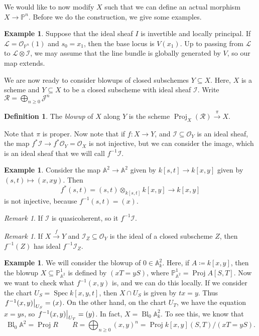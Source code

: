 \documentclass[leqno, openany]{memoir}
\theoremstyle{definition}
\newtheorem{defn}[thm]{Definition}
\newtheorem{exm}[thm]{Example}
\theoremstyle{remark}
\newtheorem{rmk}[thm]{Remark}
\theoremstyle{plain}
\theoremstyle{definition}
\theoremstyle{remark}
\newcommand{\A}{\mathbb{A}}
\renewcommand{\P}{\mathbb{P}}
\newcommand{\mc}[1]{\mathcal{#1}}
\DeclareMathOperator{\Spec}{Spec}
\DeclareMathOperator{\Proj}{Proj}
\DeclareMathOperator{\Bl}{Bl}
\begin{document}
We would like to now modify $X$ such that we can define an actual morphism $X
\to \P^n$. Before we do the construction, we give some examples.

\begin{exm} Suppose that the ideal sheaf $I$ is invertible and locally
    principal. If $\mc{L} = \mc{O}_{\P^n}(1)$ and $s_0 = x_1$, then the base
    locus is $V(x_1)$. Up to passing from $\mc{L}$ to $\mc{L} \otimes \mc{I}$,
    we may assume that the line bundle is globally generated by $V$, so our map
    extends.  \end{exm}

We are now ready to consider blowups of closed subschemes $Y \subseteq X$.
Here, $X$ is a scheme and $Y \subseteq X$ to be a closed subscheme with ideal
sheaf $\mc{I}$. Write $\mc{R} = \bigoplus_{n \geq 0} \mc{J}^n$

\begin{defn} The \textit{blowup} of $X$ along $Y$ is the scheme
$\Proj_X(\mc{R}) \xrightarrow{\pi} X$.  \end{defn}

Note that $\pi$ is proper. Now note that if $f \colon X \to Y$, and $\mc{I}
\subseteq \mc{O}_Y$ is an ideal sheaf, the map $f^* \mc{I} \to f^* \mc{O}_Y =
\mc{O}_X$ is not injective, but we can consider the image, which is an ideal
sheaf that we will call $f^{-1}\mc{I}$.

\begin{exm} Consider the map $\A^2 \to \A^2$ given by $k[s,t] \to k[x,y]$ given
    by $(s,t) \mapsto (x, xy)$. Then \[ f^*(s,t) = (s,t) \otimes_{k[s,t]}
    k[x,y] \to k[x,y] \] is not injective, because $f^{-1}(s,t) = (x)$.
\end{exm}

\begin{rmk} If $\mc{I}$ is quasicoherent, so it $f^{-1}\mc{I}$.  \end{rmk}

\begin{rmk} If $X \xrightarrow{f} Y$ and $\mc{I}_Z \subseteq \mc{O}_Y$ is the
ideal of a closed subscheme $Z$, then $f^{-1}(Z)$ has ideal $f^{-1} \mc{I}_Z$.
\end{rmk}

\begin{exm} We will consider the blowup of $0 \in \A^2_k$. Here, if $A
    \coloneqq k[x,y]$, then the blowup $X \subseteq \P^1_{\A^2}$ is defined by
    $(xT = yS)$, where $\P^1_{\A^2} = \Proj A[S,T]$. Now we want to check what
    $f^{-1}(x,y)$ is, and we can do this locally. If we consider the chart $U_S
    = \Spec k[x,y,t]$, then $X \cap U_S$ is given by $tx = y$. Thus $\eval{
    f^{-1}(x,y) }_{U_S} = (x)$. On the other hand, on the chart $U_T$, we have
    the equation $x = ys$, so $\eval{f^{-1}(x,y)}_{U_T} = (y)$. In fact, $X =
    \Bl_0 \A^2_k$. To see this, we know that \[ \Bl_0 \A^2 = \Proj R \qquad R =
    \bigoplus_{n \geq 0} {(x,y)}^n = \Proj k[x,y](S,T) / (xT = yS). \]
\end{exm}
\end{document}
